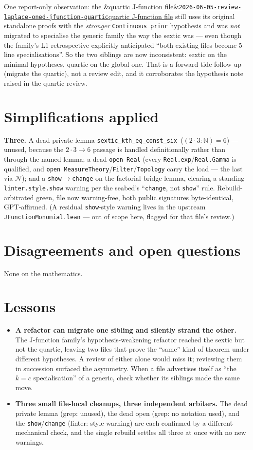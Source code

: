 \documentclass[11pt]{article}
\newcommand{\reviewref}[2][]{\href{https://therisensea.org/reviews/#2/}{\ifx&#1&\texttt{#2}\else#1\fi}}
\begin{document}
One report-only observation: the \reviewref[quartic J-function file]{2026-06-05-review-laplace-oned-jfunction-quartic}
still uses its original standalone proofs with the \emph{stronger} \texttt{Continuous prior} hypothesis and was
\emph{not} migrated to specialise the generic family the way the sextic was --- even though the family's L1
retrospective explicitly anticipated ``both existing files become 5-line specialisations''. So the two siblings
are now inconsistent: sextic on the minimal hypotheses, quartic on the global one. That is a forward-tide
follow-up (migrate the quartic), not a review edit, and it corroborates the hypothesis note raised in the
quartic review.

\section{Simplifications applied}
\textbf{Three.} A dead private lemma \texttt{sextic\_kth\_eq\_const\_six}~($(2\cdot3{:}\mathbb N)=6$) --- unused,
because the $2\cdot3\to6$ passage is handled definitionally rather than through the named lemma; a dead
\texttt{open Real} (every \texttt{Real.exp}/\texttt{Real.Gamma} is qualified, and \texttt{open
MeasureTheory}/\texttt{Filter}/\texttt{Topology} carry the load --- the last via $\mathcal N$); and a
\texttt{show}$\to$\texttt{change} on the factorial-bridge lemma, clearing a standing \texttt{linter.style.show}
warning per the seabed's ``\texttt{change}, not \texttt{show}'' rule. Rebuild-arbitrated green, file now
warning-free, both public signatures byte-identical, GPT-affirmed. (A residual \texttt{show}-style warning lives
in the upstream \texttt{JFunctionMonomial.lean} --- out of scope here, flagged for that file's review.)

\section{Disagreements and open questions}
None on the mathematics.

\section{Lessons}
\begin{itemize}[noitemsep]
  \item \textbf{A refactor can migrate one sibling and silently strand the other.} The J-function family's
    hypothesis-weakening refactor reached the sextic but not the quartic, leaving two files that prove the
    ``same'' kind of theorem under different hypotheses. A review of either alone would miss it; reviewing them
    in succession surfaced the asymmetry. When a file advertises itself as ``the $k=c$ specialisation'' of a
    generic, check whether its siblings made the same move.
  \item \textbf{Three small file-local cleanups, three independent arbiters.} The dead private lemma (grep:
    unused), the dead open (grep: no notation used), and the \texttt{show}/\texttt{change} (linter: style
    warning) are each confirmed by a different mechanical check, and the single rebuild settles all three at
    once with no new warnings.
\end{itemize}
\end{document}
